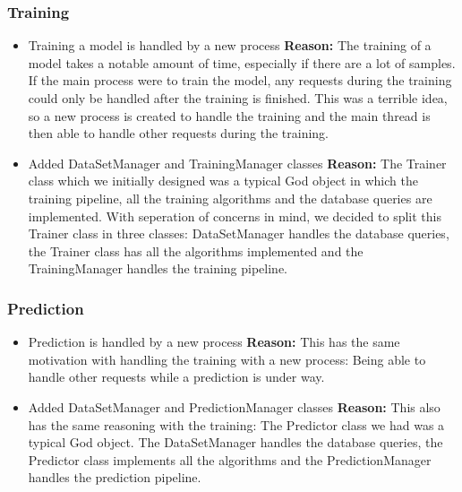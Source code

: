 \subsubsection{Training}
\begin{itemize}
    \item
    Training a model is handled by a new process
    \newline
    \textbf{Reason:} The training of a model takes a notable amount of time,
    especially if there are a lot of samples. If the main process were to train
    the model, any requests during the training could only be handled after the
    training is finished. This was a terrible idea, so a new process is created
    to handle the training and the main thread is then able to handle other
    requests during the training.

    \item
    Added DataSetManager and TrainingManager classes
    \newline
    \textbf{Reason:} The Trainer class which we initially designed was a typical
    God object in which the training pipeline, all the training algorithms and
    the database queries are implemented. With seperation of concerns in mind, we
    decided to split this Trainer class in three classes: DataSetManager handles 
    the database queries, the Trainer class has all the algorithms implemented and
    the TrainingManager handles the training pipeline.
\end{itemize}

\subsubsection{Prediction}
\begin{itemize}
    \item
    Prediction is handled by a new process
    \newline
    \textbf{Reason:} This has the same motivation with handling the training with a
    new process: Being able to handle other requests while a prediction is under way.

    \item
    Added DataSetManager and PredictionManager classes
    \newline
    \textbf{Reason:} This also has the same reasoning with the training: The Predictor
    class we had was a typical God object. The DataSetManager handles the database
    queries, the Predictor class implements all the algorithms and the PredictionManager
    handles the prediction pipeline.
\end{itemize}